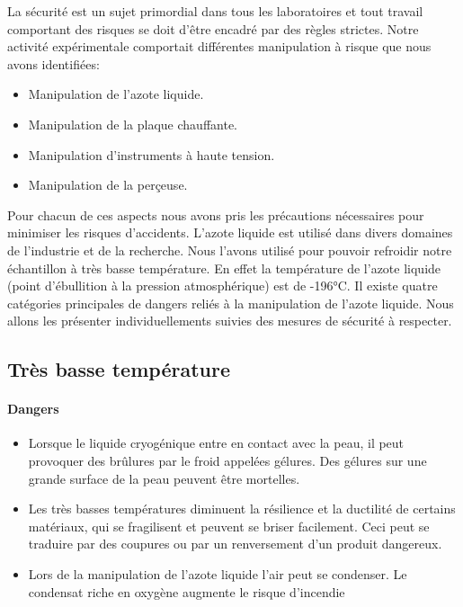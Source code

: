 La sécurité est un sujet primordial dans tous les laboratoires et tout travail comportant des risques se doit d'être encadré par des règles strictes. Notre activité expérimentale comportait différentes manipulation à risque que nous avons identifiées:
\begin{itemize}
  \item Manipulation de l'azote liquide.
  \item Manipulation de la plaque chauffante.
  \item Manipulation d'instruments à haute tension.
  \item Manipulation de la perçeuse.
\end{itemize}

Pour chacun de ces aspects nous avons pris les précautions nécessaires pour minimiser les risques d'accidents. 
L'azote liquide est utilisé dans divers domaines de l'industrie et de la recherche. Nous l'avons utilisé pour pouvoir refroidir notre échantillon à très basse température. En effet la température de l’azote liquide (point d’ébullition à la pression atmosphérique) est de -196°C. 
Il existe quatre catégories principales de dangers reliés à la manipulation de l'azote liquide. Nous allons les présenter individuellements suivies des mesures de sécurité à respecter.

\subsection*{Très basse température}

\paragraph*{Dangers}
\begin{itemize}
  \item Lorsque le liquide cryogénique entre en contact avec la peau, il peut provoquer des 
brûlures par le froid appelées gélures. Des gélures sur une grande surface de la peau peuvent être mortelles. 
  \item Les très basses températures diminuent la résilience et la ductilité de certains 
matériaux, qui se fragilisent et peuvent se briser facilement. Ceci peut se traduire par des coupures ou par un renversement d'un produit dangereux.
  \item Lors de la manipulation de l'azote liquide l’air peut se condenser. Le condensat riche en oxygène augmente le risque d'incendie 
\end{itemize}

